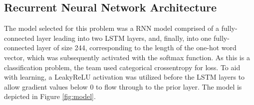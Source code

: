 \documentclass[conference]{IEEEtran}
\begin{document}
\subsection{Recurrent Neural Network Architecture}

The model selected for this problem was a RNN model comprised of a fully-connected layer leading into two LSTM layers, and, finally, into one fully-connected layer of size 244, corresponding to the length of the one-hot word vector, which was subsequently activated with the softmax function. As this is a classification problem, the team used categorical crossentropy for loss. To aid with learning, a LeakyReLU activation was utilized before the LSTM layers to allow gradient values below $0$ to flow through to the prior layer. The model is depicted in Figure \ref{fig:model}.
\end{document}
